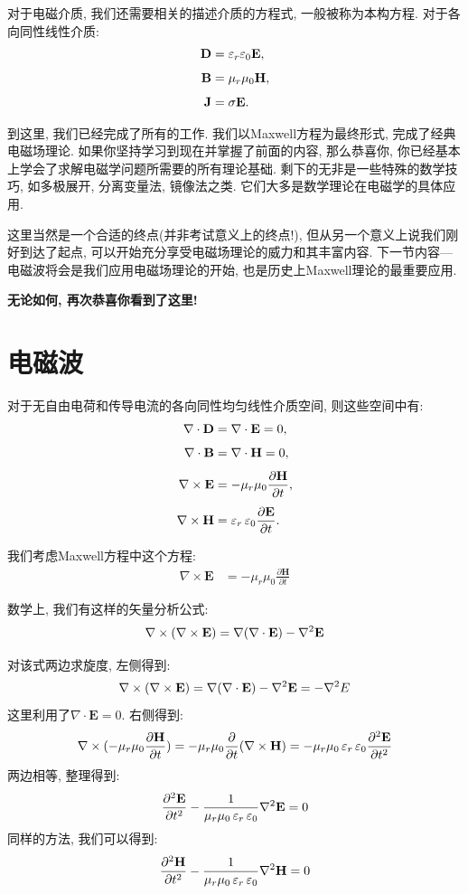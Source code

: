 对于电磁介质, 我们还需要相关的描述介质的方程式, 一般被称为本构方程. 对于各向同性线性介质:
\begin{align*}
\mathbf{D} &= \mathop{}\!\varepsilon_r\varepsilon_0 \mathbf{E}, \\[4pt]
\mathbf{B} &= \mu_r\mu_0 \mathbf{H}, \\[4pt]
\mathbf{J} &= \sigma \mathbf{E}.
\end{align*}

到这里, 我们已经完成了所有的工作. 我们以Maxwell方程为最终形式, 完成了经典电磁场理论. 如果你坚持学习到现在并掌握了前面的内容, 那么恭喜你, 你已经基本上学会了求解电磁学问题所需要的所有理论基础. 剩下的无非是一些特殊的数学技巧, 如多极展开, 分离变量法, 镜像法之类. 它们大多是数学理论在电磁学的具体应用.

这里当然是一个合适的终点(并非考试意义上的终点!), 但从另一个意义上说我们刚好到达了起点, 可以开始充分享受电磁场理论的威力和其丰富内容. 下一节内容---电磁波将会是我们应用电磁场理论的开始, 也是历史上Maxwell理论的最重要应用.
\begin{center}
  \textbf{无论如何, 再次恭喜你看到了这里!}
\end{center}

\section{电磁波}
对于无自由电荷和传导电流的各向同性均匀线性介质空间, 则这些空间中有:
\begin{align*}
\nabla\cdot\mathbf{D} &= \nabla\cdot\mathbf{E} =0, \\[4pt]
\nabla\cdot\mathbf{B} &= \nabla\cdot\mathbf{H}= 0, \\[4pt]
\nabla\times\mathbf{E} &= -\mu_r\mu_0\frac{\partial\mathbf{H}}{\partial t}, \\[4pt]
\nabla\times\mathbf{H} &= \mathop{}\!\varepsilon_r\mathop{}\!\varepsilon_0\frac{\partial\mathbf{E}}{\partial t}.
\end{align*}

我们考虑Maxwell方程中这个方程:
\begin{align*}
\nabla\times\mathbf{E} &= -\mu_r\mu_0\frac{\partial\mathbf{H}}{\partial t}
\end{align*}

数学上, 我们有这样的矢量分析公式:
\[
\nabla \times  (\nabla \times \mathbf{E}) = \nabla(\nabla \cdot \mathbf{E})-\nabla^2 \mathbf{E}
\]

对该式两边求旋度, 左侧得到:
\[
\nabla \times (\nabla \times \mathbf{E})= \nabla(\nabla \cdot \mathbf{E})-\nabla^2 \mathbf{E} = -\nabla^2 E
\]
这里利用了$\nabla\cdot\mathbf{E} =0$. 右侧得到:
\[
\nabla \times (-\mu_r\mu_0\frac{\partial\mathbf{H}}{\partial t}) = -\mu_r\mu_0\frac{\partial}{\partial t} (\nabla \times \mathbf{H}) = -\mu_r\mu_0\mathop{}\!\varepsilon_r\mathop{}\!\varepsilon_0 \frac{\partial^2 \mathbf{E}}{\partial t^2}
\]
两边相等, 整理得到:
\[
\frac{\partial^2 \mathbf{E}}{\partial t^2} - \frac{1}{\mu_r\mu_0\mathop{}\!\varepsilon_r\mathop{}\!\varepsilon_0} \nabla^2 \mathbf{E} = 0
\]
同样的方法, 我们可以得到:
\[
\frac{\partial^2 \mathbf{H}}{\partial t^2} - \frac{1}{\mu_r\mu_0\mathop{}\!\varepsilon_r\mathop{}\!\varepsilon_0} \nabla^2 \mathbf{H} = 0
\]

